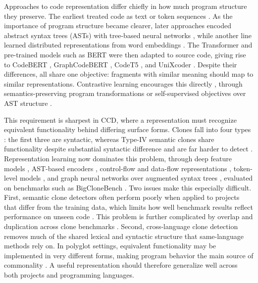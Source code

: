 \documentclass[final,5p,times,twocolumn]{elsarticle}
\theoremstyle{plain}
\begin{document}
Approaches to code representation differ chiefly in how much program structure they preserve. The earliest treated code as text or token sequences \cite{schleimer2003winnowing}. As the importance of program structure became clearer, later approaches encoded abstract syntax trees (ASTs) with tree-based neural networks \cite{mou2016tbcnn}, while another line learned distributed representations from word embeddings \cite{mikolov2013word2vec,alon2019code2vec}. The Transformer \cite{vaswani2017attention} and pre-trained models such as BERT \cite{devlin2019bert} were then adapted to source code, giving rise to CodeBERT \cite{feng2020codebert}, GraphCodeBERT \cite{guo2021graphcodebert}, CodeT5 \cite{wang2021codet5}, and UniXcoder \cite{guo2022unixcoder}. Despite their differences, all share one objective: fragments with similar meaning should map to similar representations. Contrastive learning encourages this directly \cite{chen2020simclr}, through semantics-preserving program transformations \cite{jain2021contracode,bui2021corder} or self-supervised objectives over AST structure \cite{bui2021infercode}.

This requirement is sharpest in CCD, where a representation must recognize equivalent functionality behind differing surface forms. Clones fall into four types \cite{roy2007survey}: the first three are syntactic, whereas Type-IV semantic clones share functionality despite substantial syntactic difference and are far harder to detect \cite{alomari2020semanticclonebench}. Representation learning now dominates this problem, through deep feature models \cite{white2016deep,wei2017cdlh}, AST-based encoders \cite{zhang2019astnn}, control-flow and data-flow representations \cite{zhao2018deepsim}, token-level models \cite{li2017cclearner}, and graph neural networks over augmented syntax trees \cite{wang2020faast,wu2020scdetector}, evaluated on benchmarks such as BigCloneBench \cite{svajlenko2014bigclonebench}. Two issues make this especially difficult. First, semantic clone detectors often perform poorly when applied to projects that differ from the training data, which limits how well benchmark results reflect performance on unseen code \cite{sonnekalb2022generalizability}. This problem is further complicated by overlap and duplication across clone benchmarks \cite{lopez2025interdataset}. Second, cross-language clone detection removes much of the shared lexical and syntactic structure that same-language methods rely on. In polyglot settings, equivalent functionality may be implemented in very different forms, making program behavior the main source of commonality \cite{perez2019crosslang,zhang2024fsdclcd,alam2023gptclonebench}. A useful representation should therefore generalize well across both projects and programming languages.
\end{document}
